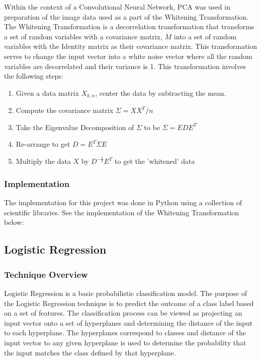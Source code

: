 \documentclass[12pt, titlepage]{article}
\begin{document}
  Within the context of a Convolutional Neural Network, PCA was used in preparation of the image data used as a part of the Whitening Transformation.
  The Whitening Transformation is a decorrelation transformation that transforms a set of random variables with a covariance matrix, $M$ into a set of
  random variables with the Identity matrix as their covariance matrix. This transformation serves to change the input vector into a white noise vector
  where all the random variables are decorrelated and their variance is 1. This transformation involves the following steps: \\
  \begin{enumerate}
    \item Given a data matrix $X_{k,n}$, center the data by subtracting the mean.
	\item Compute the covariance matrix $\Sigma = X X^{T} / n$
	\item Take the Eigenvalue Decomposition of $\Sigma$ to be $\Sigma = E D E^{T}$
	\item Re-arrange to get $D = E^{T} \Sigma E$
	\item Multiply the data $X$ by $D^{-\frac{1}{2}} E^{T}$ to get the 'whitened' data
  \end{enumerate}

  \subsubsection{Implementation}
  
  The implementation for this project was done in Python using a collection of scientific libraries. See the implementation of the Whitening Transformation below:
  

\subsection{Logistic Regression}
  \subsubsection{Technique Overview}
  
  Logistic Regression is a basic probabilistic classification model. The purpose of the Logistic Regression technique is to predict the outcome of a class label
  based on a set of features. The classification process can be viewed as projecting an input vector onto a set of hyperplanes and determining the distance of the
  input to each hyperplane. The hyperplanes correspond to classes and distance of the input vector to any given hyperplane is used to determine the probability that
  the input matches the class defined by that hyperplane.
\end{document}

